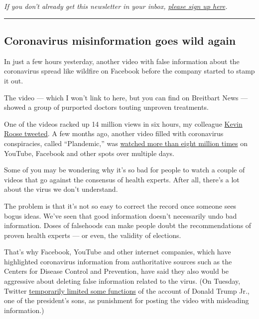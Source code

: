 \emph{If you don't already get this newsletter in your inbox,}
\href{https://www.nytimes3xbfgragh.onion/newsletters/signup/OT}{\emph{please
sign up here}}\emph{.}

\begin{center}\rule{0.5\linewidth}{\linethickness}\end{center}

\hypertarget{coronavirus-misinformation-goes-wild-again}{%
\subsection{Coronavirus misinformation goes wild
again}\label{coronavirus-misinformation-goes-wild-again}}

In just a few hours yesterday, another video with false information
about the coronavirus spread like wildfire on Facebook before the
company started to stamp it out.

The video --- which I won't link to here, but you can find on Breitbart
News --- showed a group of purported doctors touting unproven
treatments.

One of the videos racked up 14 million views in six hours, my colleague
\href{https://twitter.com/kevinroose/status/1287906751069581318}{Kevin
Roose tweeted}. A few months ago, another video filled with coronavirus
conspiracies, called ``Plandemic,'' was
\href{https://www.nytimes3xbfgragh.onion/2020/05/20/technology/plandemic-movie-youtube-facebook-coronavirus.html}{watched
more than eight million times} on YouTube, Facebook and other spots over
multiple days.

Some of you may be wondering why it's so bad for people to watch a
couple of videos that go against the consensus of health experts. After
all, there's a lot about the virus we don't understand.

The problem is that it's not so easy to correct the record once someone
sees bogus ideas. We've seen that good information doesn't necessarily
undo bad information. Doses of falsehoods can make people doubt the
recommendations of proven health experts --- or even, the validity of
elections.

That's why Facebook, YouTube and other internet companies, which have
highlighted coronavirus information from authoritative sources such as
the Centers for Disease Control and Prevention, have said they also
would be aggressive about deleting false information related to the
virus. (On Tuesday, Twitter
\href{https://www.washingtonpost.com/nation/2020/07/28/trump-coronavirus-misinformation-twitter/}{temporarily
limited some functions} of the account of Donald Trump Jr., one of the
president's sons, as punishment for posting the video with misleading
information.)

